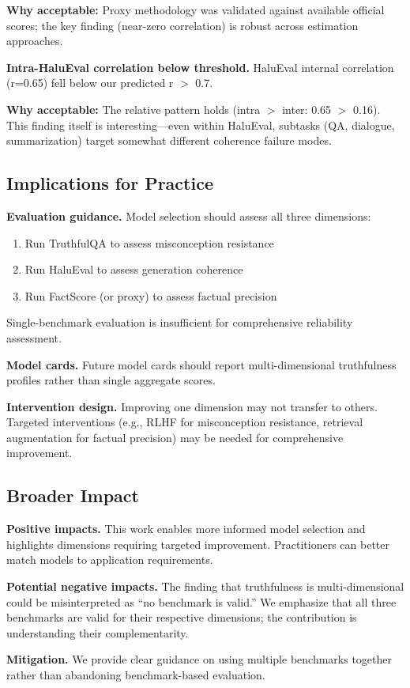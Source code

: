 \textbf{Why acceptable:} Proxy methodology was validated against available official scores; the key finding (near-zero correlation) is robust across estimation approaches.

\textbf{Intra-HaluEval correlation below threshold.} HaluEval internal correlation (r=0.65) fell below our predicted r $>$ 0.7.

\textbf{Why acceptable:} The relative pattern holds (intra $>$ inter: 0.65 $>$ 0.16). This finding itself is interesting---even within HaluEval, subtasks (QA, dialogue, summarization) target somewhat different coherence failure modes.

\subsection{Implications for Practice}

\textbf{Evaluation guidance.} Model selection should assess all three dimensions:
\begin{enumerate}
\item Run TruthfulQA to assess misconception resistance
\item Run HaluEval to assess generation coherence
\item Run FactScore (or proxy) to assess factual precision
\end{enumerate}

Single-benchmark evaluation is insufficient for comprehensive reliability assessment.

\textbf{Model cards.} Future model cards should report multi-dimensional truthfulness profiles rather than single aggregate scores.

\textbf{Intervention design.} Improving one dimension may not transfer to others. Targeted interventions (e.g., RLHF for misconception resistance, retrieval augmentation for factual precision) may be needed for comprehensive improvement.

\subsection{Broader Impact}

\textbf{Positive impacts.} This work enables more informed model selection and highlights dimensions requiring targeted improvement. Practitioners can better match models to application requirements.

\textbf{Potential negative impacts.} The finding that truthfulness is multi-dimensional could be misinterpreted as ``no benchmark is valid.'' We emphasize that all three benchmarks are valid for their respective dimensions; the contribution is understanding their complementarity.

\textbf{Mitigation.} We provide clear guidance on using multiple benchmarks together rather than abandoning benchmark-based evaluation.
